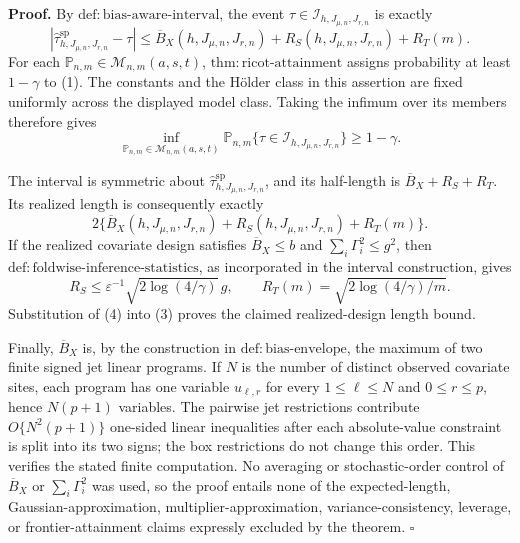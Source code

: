 \textbf{Proof.}
By \(\mathrm{def:bias\text{-}aware\text{-}interval}\), the event
\(\tau\in\mathcal I_{h,J_{\mu,n},J_{r,n}}\) is exactly
\[
\left|\widehat\tau^{\mathrm{sp}}_{h,J_{\mu,n},J_{r,n}}-\tau\right|
\le\overline B_X(h,J_{\mu,n},J_{r,n})
+R_S(h,J_{\mu,n},J_{r,n})+R_T(m).
\tag{1}
\]
For each \(\mathbb P_{n,m}\in\mathcal M_{n,m}(a,s,t)\),
\(\mathrm{thm:ricot\text{-}attainment}\) assigns probability at least
\(1-\gamma\) to (1).  The constants and the H\"older class in this assertion are
fixed uniformly across the displayed model class.  Taking the infimum over its
members therefore gives
\[
\inf_{\mathbb P_{n,m}\in\mathcal M_{n,m}(a,s,t)}
\mathbb P_{n,m}\{\tau\in\mathcal I_{h,J_{\mu,n},J_{r,n}}\}
\ge1-\gamma.
\tag{2}
\]

The interval is symmetric about
\(\widehat\tau^{\mathrm{sp}}_{h,J_{\mu,n},J_{r,n}}\), and its half-length is
\(\overline B_X+R_S+R_T\).  Its realized length is consequently exactly
\[
2\{\overline B_X(h,J_{\mu,n},J_{r,n})
+R_S(h,J_{\mu,n},J_{r,n})+R_T(m)\}.
\tag{3}
\]
If the realized covariate design satisfies \(\overline B_X\le b\) and
\(\sum_i\Gamma_i^2\le g^2\), then
\(\mathrm{def:foldwise\text{-}inference\text{-}statistics}\), as incorporated in
the interval construction, gives
\[
R_S\le\varepsilon^{-1}\sqrt{2\log(4/\gamma)}\,g,
\qquad
R_T(m)=\sqrt{2\log(4/\gamma)/m}.
\tag{4}
\]
Substitution of (4) into (3) proves the claimed realized-design length bound.

Finally, \(\overline B_X\) is, by the construction in
\(\mathrm{def:bias\text{-}envelope}\), the maximum of two finite signed jet linear
programs.  If \(N\) is the number of distinct observed covariate sites, each program
has one variable \(u_{\ell,r}\) for every
\(1\le\ell\le N\) and \(0\le r\le p\), hence \(N(p+1)\) variables.  The pairwise
jet restrictions contribute \(O\{N^2(p+1)\}\) one-sided linear inequalities after
each absolute-value constraint is split into its two signs; the box restrictions
do not change this order.  This verifies the stated finite computation.  No
averaging or stochastic-order control of \(\overline B_X\) or
\(\sum_i\Gamma_i^2\) was used, so the proof entails none of the expected-length,
Gaussian-approximation, multiplier-approximation, variance-consistency, leverage,
or frontier-attainment claims expressly excluded by the theorem.
\(\square\)